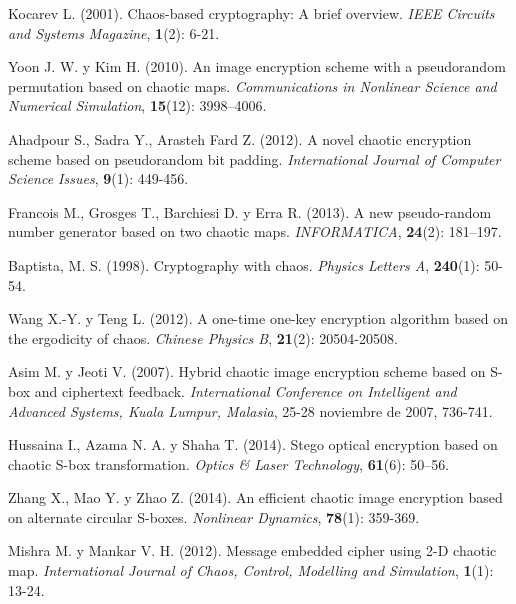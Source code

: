 \begin{thebibliography}{00}
Kocarev L. (2001).
\newblock Chaos-based cryptography: A brief overview.
\newblock \emph{IEEE Circuits and Systems Magazine}, \textbf{1}(2): 6-21.

Yoon J. W. y Kim H. (2010).
\newblock An image encryption scheme with a pseudorandom permutation based on chaotic maps.
\newblock \emph{Communications in Nonlinear Science and Numerical Simulation}, \textbf{15}(12): 3998–4006.

Ahadpour S., Sadra Y., Arasteh Fard Z. (2012).
\newblock A novel chaotic encryption scheme based on pseudorandom bit padding.
\newblock \emph{International Journal of Computer Science Issues},  \textbf{9}(1): 449-456.

Francois M., Grosges T., Barchiesi D. y Erra R. (2013).
\newblock A new pseudo-random number generator based on two chaotic maps.
\newblock \emph{INFORMATICA}, \textbf{24}(2): 181–197.

Baptista, M. S. (1998).
\newblock Cryptography with chaos.
\newblock \emph{Physics Letters A}, \textbf{240}(1): 50-54.

Wang X.-Y. y Teng L. (2012).
\newblock A one-time one-key encryption algorithm based on the ergodicity of chaos.
\newblock \emph{Chinese Physics B}, \textbf{21}(2): 20504-20508.

Asim M. y  Jeoti V. (2007).
\newblock Hybrid chaotic image encryption scheme based on S-box and ciphertext feedback.
\newblock \emph{International Conference on Intelligent and Advanced Systems, Kuala Lumpur, Malasia}, 25-28 noviembre de 2007, 736-741.

Hussaina I., Azama N. A. y Shaha T. (2014).
\newblock Stego optical encryption based on chaotic S-box transformation.
\newblock \emph{Optics \& Laser Technology}, \textbf{61}(6): 50–56.

Zhang X., Mao Y. y Zhao Z. (2014).
\newblock An efficient chaotic image encryption based on alternate circular S-boxes.
\newblock \emph{Nonlinear Dynamics}, \textbf{78}(1): 359-369.

Mishra M. y Mankar V. H. (2012).
\newblock Message embedded cipher using 2-D chaotic map.
\newblock \emph{International Journal of Chaos, Control, Modelling and Simulation}, \textbf{1}(1): 13-24.


\end{thebibliography}

